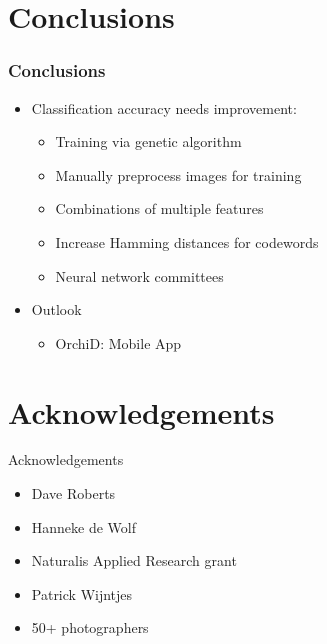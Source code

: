 \documentclass[]{beamer}
\begin{document}
\section{Conclusions}

    \begin{frame}
        \frametitle{Conclusions}

        \begin{itemize}
            \item Classification accuracy needs improvement:
            \begin{itemize}
                \item Training via genetic algorithm
                \item Manually preprocess images for training
                \item Combinations of multiple features
                \item Increase Hamming distances for codewords
                \item Neural network committees
            \end{itemize}
        \end{itemize}

        \begin{itemize}
            \item Outlook
            \begin{itemize}
                \item OrchiD: Mobile App
            \end{itemize}
        \end{itemize}
    \end{frame}


\section*{Acknowledgements}

    \begin{frame}{Acknowledgements}

        \begin{itemize}
            \item Dave Roberts
            \item Hanneke de Wolf
            \item Naturalis Applied Research grant
            \item Patrick Wijntjes
            \item 50+ photographers
        \end{itemize}
    \end{frame}
\end{document}
